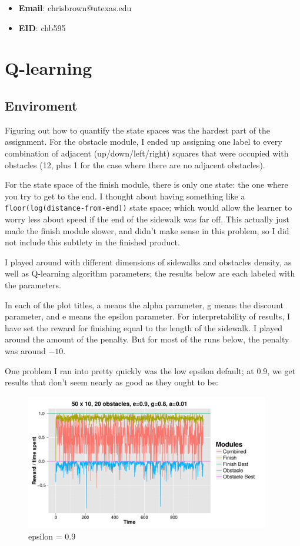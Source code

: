\documentclass[11pt]{report}
\begin{document}
\begin{itemize}
  \item \textbf{Email}: chrisbrown@utexas.edu
  \item \textbf{EID}: chb595
\end{itemize}

\section{Q-learning}

\subsection{Enviroment}

Figuring out how to quantify the state spaces was the hardest part of the assignment. For the obstacle module, I ended up assigning one label to every combination of adjacent (up/down/left/right) squares that were occupied with obstacles (12, plus 1 for the case where there are no adjacent obstacles).

For the state space of the finish module, there is only one state: the one where you try to get to the end. I thought about having something like a \texttt{floor(log(distance-from-end))} state space; which would allow the learner to worry less about speed if the end of the sidewalk was far off. This actually just made the finish module slower, and didn't make sense in this problem, so I did not include this subtlety in the finished product.

I played around with different dimensions of sidewalks and obstacles density, as well as Q-learning algorithm parameters; the results below are each labeled with the parameters.

In each of the plot titles, a means the alpha parameter, g means the discount parameter, and e means the epsilon parameter.
For interpretability of results, I have set the reward for finishing equal to the length of the sidewalk. I played around the amount of the penalty. But for most of the runs below, the penalty was around $-10$.

One problem I ran into pretty quickly was the low epsilon default; at 0.9, we get results that don't seem nearly as good as they ought to be:

\begin{figure}[H]
  \centering
  \includegraphics[width=0.95\textwidth]{results/qlearn-s50x10-o20.pdf}
  \caption{epsilon = 0.9}
  \label{fig:ep09}
\end{figure}
\end{document}
